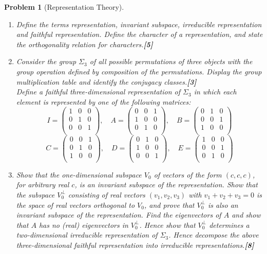 \documentclass[a4paper]{article}
\theoremstyle{new}
\newtheorem{qns}{Problem}[section]
\begin{document}
\begin{qns}[Representation Theory]\leavevmode
\begin{enumerate}[label=(\roman*)]
    \item Define the terms representation, invariant subspace, irreducible representation and faithful representation. Define the character of a representation, and state the orthogonality relation for characters.\hfill\textbf{[5]}
    \item Consider the group $\Sigma_3$ of all possible permutations of three objects with the group operation defined by composition of the permutations. Display the group multiplication table and identify the conjugacy classes.\hfill\textbf{[3]}\\[5pt]
Define a faithful three-dimensional representation of $\Sigma_3$ in which each element is represented by one of the following matrices:
$$I=\begin{pmatrix}1&0&0\\0&1&0\\0&0&1\\\end{pmatrix},\quad A=\begin{pmatrix}0&0&1\\1&0&0\\0&1&0\\\end{pmatrix},\quad  B=\begin{pmatrix}0&1&0\\0&0&1\\1&0&0\\\end{pmatrix}$$
$$C=\begin{pmatrix}0&0&1\\0&1&0\\1&0&0\\\end{pmatrix},\quad D=\begin{pmatrix}0&1&0\\1&0&0\\0&0&1\\\end{pmatrix},\quad  E=\begin{pmatrix}1&0&0\\0&0&1\\0&1&0\\\end{pmatrix}$$
\item Show that the one-dimensional subspace $V_0$ of vectors of the form $(c, c, c)$, for arbitrary real $c$, is an invariant subspace of the representation. Show that the subspace $V^\perp_0$ consisting of real vectors $(v_1, v_2, v_3)$ with $v_1 + v_2 + v_3 = 0$ is the space of real vectors orthogonal to $V_0$, and prove that $V_0^\perp$ is also an invariant subspace of the representation. Find the eigenvectors of $A$ and show that $A$ has no (real) eigenvectors in $V^\perp_0$. Hence show that $V^\perp_0$ determines a two-dimensional irreducible representation of $\Sigma_3$. Hence decompose the above three-dimensional faithful representation into irreducible representations.\hfill\textbf{[8]}

\end{enumerate}
\end{qns}
\end{document}
